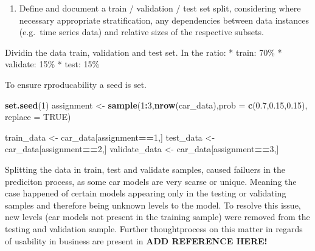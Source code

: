 \documentclass[sigchi]{acmart}
\def\tightlist{}
\newenvironment{Shaded}{\begin{snugshade}}{\end{snugshade}}
\newcommand{\CommentTok}[1]{\textcolor[rgb]{0.56,0.35,0.01}{\textit{#1}}}
\newcommand{\DataTypeTok}[1]{\textcolor[rgb]{0.13,0.29,0.53}{#1}}
\newcommand{\DecValTok}[1]{\textcolor[rgb]{0.00,0.00,0.81}{#1}}
\newcommand{\FloatTok}[1]{\textcolor[rgb]{0.00,0.00,0.81}{#1}}
\newcommand{\KeywordTok}[1]{\textcolor[rgb]{0.13,0.29,0.53}{\textbf{#1}}}
\newcommand{\NormalTok}[1]{#1}
\newcommand{\OperatorTok}[1]{\textcolor[rgb]{0.81,0.36,0.00}{\textbf{#1}}}
\newcommand{\OtherTok}[1]{\textcolor[rgb]{0.56,0.35,0.01}{#1}}
\newcommand{\StringTok}[1]{\textcolor[rgb]{0.31,0.60,0.02}{#1}}
\begin{document}
\begin{enumerate}
\def\labelenumi{\alph{enumi}.}
\setcounter{enumi}{2}
\tightlist
\item
  Define and document a train / validation / test set split, considering where necessary appropriate stratification, any dependencies between data instances (e.g.~time series data) and relative sizes of the respective subsets.
\end{enumerate}

Dividin the data train, validation and test set. In the ratio:
* train: 70\%
* validate: 15\%
* test: 15\%

To ensure rproducability a seed is set.

\begin{Shaded}
\begin{Highlighting}[]
\KeywordTok{set.seed}\NormalTok{(}\DecValTok{1}\NormalTok{)}
\NormalTok{assignment <-}\StringTok{ }\KeywordTok{sample}\NormalTok{(}\DecValTok{1}\OperatorTok{:}\DecValTok{3}\NormalTok{,}\KeywordTok{nrow}\NormalTok{(car_data),}\DataTypeTok{prob =} \KeywordTok{c}\NormalTok{(}\FloatTok{0.7}\NormalTok{,}\FloatTok{0.15}\NormalTok{,}\FloatTok{0.15}\NormalTok{), }\DataTypeTok{replace =} \OtherTok{TRUE}\NormalTok{)}

\NormalTok{train_data <-}\StringTok{ }\NormalTok{car_data[assignment}\OperatorTok{==}\DecValTok{1}\NormalTok{,]}
\NormalTok{test_data <-}\StringTok{ }\NormalTok{car_data[assignment}\OperatorTok{==}\DecValTok{2}\NormalTok{,]}
\NormalTok{validate_data <-}\StringTok{ }\NormalTok{car_data[assignment}\OperatorTok{==}\DecValTok{3}\NormalTok{,]}
\end{Highlighting}
\end{Shaded}

Splitting the data in train, test and validate samples, caused failuers in the prediciton process, as some car models are very scarse or unique. Meaning the case happened of certain models appearing only in the testing or validating samples and therefore being unknown levels to the model. To resolve this issue, new levels (car models not present in the training sample) were removed from the testing and validation sample.
Further thoughtprocess on this matter in regards of usability in business are present in \textbf{ADD REFERENCE HERE!}

\begin{Shaded}
\end{Shaded}
\end{document}
